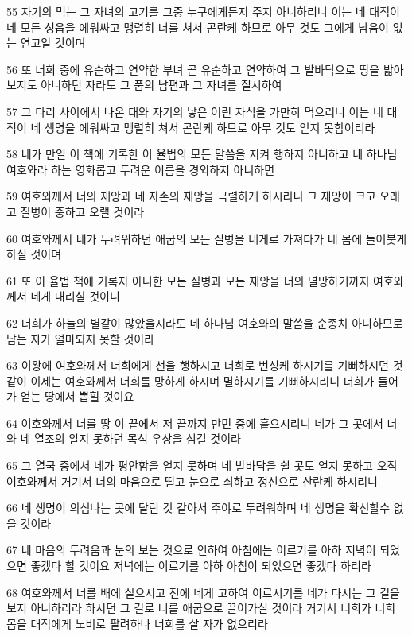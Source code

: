 \par 55 자기의 먹는 그 자녀의 고기를 그중 누구에게든지 주지 아니하리니 이는 네 대적이 네 모든 성읍을 에워싸고 맹렬히 너를 쳐서 곤란케 하므로 아무 것도 그에게 남음이 없는 연고일 것이며
\par 56 또 너희 중에 유순하고 연약한 부녀 곧 유순하고 연약하여 그 발바닥으로 땅을 밟아 보지도 아니하던 자라도 그 품의 남편과 그 자녀를 질시하여
\par 57 그 다리 사이에서 나온 태와 자기의 낳은 어린 자식을 가만히 먹으리니 이는 네 대적이 네 생명을 에워싸고 맹렬히 쳐서 곤란케 하므로 아무 것도 얻지 못함이리라
\par 58 네가 만일 이 책에 기록한 이 율법의 모든 말씀을 지켜 행하지 아니하고 네 하나님 여호와라 하는 영화롭고 두려운 이름을 경외하지 아니하면
\par 59 여호와께서 너의 재앙과 네 자손의 재앙을 극렬하게 하시리니 그 재앙이 크고 오래고 질병이 중하고 오랠 것이라
\par 60 여호와께서 네가 두려워하던 애굽의 모든 질병을 네게로 가져다가 네 몸에 들어붓게 하실 것이며
\par 61 또 이 율법 책에 기록지 아니한 모든 질병과 모든 재앙을 너의 멸망하기까지 여호와께서 네게 내리실 것이니
\par 62 너희가 하늘의 별같이 많았을지라도 네 하나님 여호와의 말씀을 순종치 아니하므로 남는 자가 얼마되지 못할 것이라
\par 63 이왕에 여호와께서 너희에게 선을 행하시고 너희로 번성케 하시기를 기뻐하시던 것 같이 이제는 여호와께서 너희를 망하게 하시며 멸하시기를 기뻐하시리니 너희가 들어가 얻는 땅에서 뽑힐 것이요
\par 64 여호와께서 너를 땅 이 끝에서 저 끝까지 만민 중에 흩으시리니 네가 그 곳에서 너와 네 열조의 알지 못하던 목석 우상을 섬길 것이라
\par 65 그 열국 중에서 네가 평안함을 얻지 못하며 네 발바닥을 쉴 곳도 얻지 못하고 오직 여호와께서 거기서 너의 마음으로 떨고 눈으로 쇠하고 정신으로 산란케 하시리니
\par 66 네 생명이 의심나는 곳에 달린 것 같아서 주야로 두려워하며 네 생명을 확신할수 없을 것이라
\par 67 네 마음의 두려움과 눈의 보는 것으로 인하여 아침에는 이르기를 아하 저녁이 되었으면 좋겠다 할 것이요 저녁에는 이르기를 아하 아침이 되었으면 좋겠다 하리라
\par 68 여호와께서 너를 배에 실으시고 전에 네게 고하여 이르시기를 네가 다시는 그 길을 보지 아니하리라 하시던 그 길로 너를 애굽으로 끌어가실 것이라 거기서 너희가 너희 몸을 대적에게 노비로 팔려하나 너희를 살 자가 없으리라

